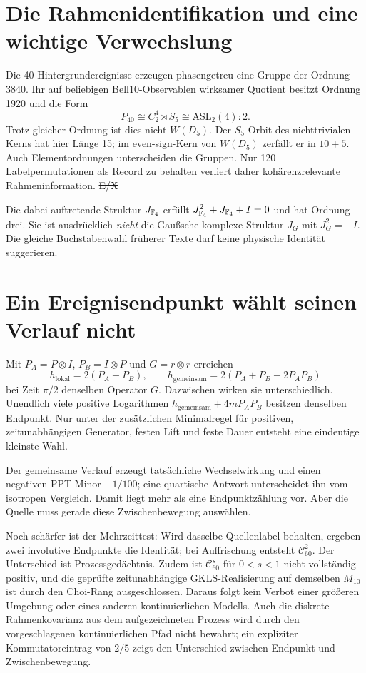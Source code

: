 \section{Die Rahmenidentifikation und eine wichtige Verwechslung}
Die 40 Hintergrundereignisse erzeugen phasengetreu eine Gruppe der Ordnung 3840. Ihr auf beliebigen Bell10-Observablen wirksamer Quotient besitzt Ordnung 1920 und die Form
\[
 P_{40}\cong C_2^4\rtimes S_5\cong\mathrm{ASL}_2(4):2.
\]
Trotz gleicher Ordnung ist dies nicht $W(D_5)$. Der $S_5$-Orbit des nichttrivialen Kerns hat hier Länge 15; im even-sign-Kern von $W(D_5)$ zerfällt er in $10+5$. Auch Elementordnungen unterscheiden die Gruppen. Nur 120 Labelpermutationen als Record zu behalten verliert daher kohärenzrelevante Rahmeninformation. \st{E/X} 

Die dabei auftretende Struktur $J_{\mathbb F_4}$ erfüllt $J_{\mathbb F_4}^2+J_{\mathbb F_4}+I=0$ und hat Ordnung drei. Sie ist ausdrücklich \emph{nicht} die Gaußsche komplexe Struktur $J_G$ mit $J_G^2=-I$. Die gleiche Buchstabenwahl früherer Texte darf keine physische Identität suggerieren.

\section{Ein Ereignisendpunkt wählt seinen Verlauf nicht}
Mit $P_A=P\otimes I$, $P_B=I\otimes P$ und $G=r\otimes r$ erreichen
\[
 h_{\mathrm{lokal}}=2(P_A+P_B),\qquad
 h_{\mathrm{gemeinsam}}=2(P_A+P_B-2P_AP_B)
\]
bei Zeit $\pi/2$ denselben Operator $G$. Dazwischen wirken sie unterschiedlich. Unendlich viele positive Logarithmen $h_{\mathrm{gemeinsam}}+4mP_AP_B$ besitzen denselben Endpunkt. Nur unter der zusätzlichen Minimalregel für positiven, zeitunabhängigen Generator, festen Lift und feste Dauer entsteht eine eindeutige kleinste Wahl. 

Der gemeinsame Verlauf erzeugt tatsächliche Wechselwirkung und einen negativen PPT-Minor $-1/100$; eine quartische Antwort unterscheidet ihn vom isotropen Vergleich. Damit liegt mehr als eine Endpunktzählung vor. Aber die Quelle muss gerade diese Zwischenbewegung auswählen.

Noch schärfer ist der Mehrzeittest: Wird dasselbe Quellenlabel behalten, ergeben zwei involutive Endpunkte die Identität; bei Auffrischung entsteht $\mathcal C_{60}^2$. Der Unterschied ist Prozessgedächtnis. Zudem ist $\mathcal C_{60}^{s}$ für $0<s<1$ nicht vollständig positiv, und die geprüfte zeitunabhängige GKLS-Realisierung auf demselben $M_{10}$ ist durch den Choi-Rang ausgeschlossen. Daraus folgt kein Verbot einer größeren Umgebung oder eines anderen kontinuierlichen Modells. Auch die diskrete Rahmenkovarianz aus dem aufgezeichneten Prozess wird durch den vorgeschlagenen kontinuierlichen Pfad nicht bewahrt; ein expliziter Kommutatoreintrag von $2/5$ zeigt den Unterschied zwischen Endpunkt und Zwischenbewegung. 

